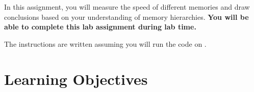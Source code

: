 



\usepackage{graphicx}

\usepackage{xparse}
\usepackage{tikz}
\usetikzlibrary{shadows}
\usepackage{lipsum}\usepackage{array,color,colortbl}


\NewDocumentCommand{}

\renewcommand{\labnumber}{\memorylabnumber}
\renewcommand{\labname}{Memory Measurement Lab}
\renewcommand{\shortlabname}{memorylab}
\renewcommand{\collaborationrules}{\memorylabcollaboration}
\renewcommand{\duedate}{\memorylabdue}
\newcommand{\nano}{\developmentboard} %
\renewcommand{\runtimeenvironment}{\memorylabenvironment}
\pagelayout

\labidentifier


In this assignment, you will measure the speed of different memories and draw
conclusions based on your understanding of memory hierarchies. \textbf{You will
be able to complete this lab assignment during lab time.}

The instructions are written assuming you will run the code on
\runtimeenvironment.

\section*{Learning Objectives}

